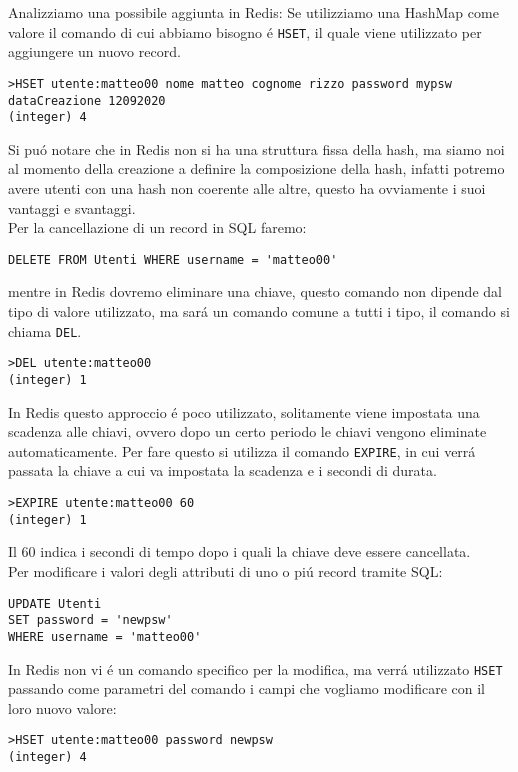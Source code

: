 Analizziamo una possibile aggiunta in Redis:
Se utilizziamo una HashMap come valore il comando di cui abbiamo bisogno é \texttt{HSET}, il quale viene utilizzato per aggiungere un nuovo record.
\begin{lstlisting}[autogobble]
>HSET utente:matteo00 nome matteo cognome rizzo password mypsw dataCreazione 12092020
(integer) 4\end{lstlisting}

Si puó notare che in Redis non si ha una struttura fissa della hash, ma siamo noi al momento della creazione a definire la composizione della hash,
infatti potremo avere utenti con una hash non coerente alle altre, questo ha ovviamente i suoi vantaggi e svantaggi.\\

Per la cancellazione di un record in SQL faremo:
\begin{lstlisting}[autogobble]
DELETE FROM Utenti WHERE username = 'matteo00'\end{lstlisting}

mentre in Redis dovremo eliminare una chiave, questo comando non dipende dal tipo di valore utilizzato, ma sará un comando comune
a tutti i tipo, il comando si chiama \texttt{DEL}.

\begin{lstlisting}[autogobble]
>DEL utente:matteo00
(integer) 1\end{lstlisting}

In Redis questo approccio é poco utilizzato, solitamente viene impostata una scadenza alle chiavi, ovvero dopo un certo periodo le chiavi vengono eliminate automaticamente.
Per fare questo si utilizza il comando \texttt{EXPIRE}, in cui verrá passata la chiave a cui va impostata la scadenza e i secondi di durata.
\begin{lstlisting}[autogobble]
>EXPIRE utente:matteo00 60
(integer) 1\end{lstlisting}
Il 60 indica i secondi di tempo dopo i quali la chiave deve essere cancellata.\\

Per modificare i valori degli attributi di uno o piú record tramite SQL:
\begin{lstlisting}[autogobble]
UPDATE Utenti
SET password = 'newpsw'
WHERE username = 'matteo00'\end{lstlisting}

In Redis non vi é un comando specifico per la modifica, ma verrá utilizzato \texttt{HSET} passando come parametri del comando
i campi che vogliamo modificare con il loro nuovo valore:
\begin{lstlisting}[autogobble]
>HSET utente:matteo00 password newpsw
(integer) 4\end{lstlisting}

